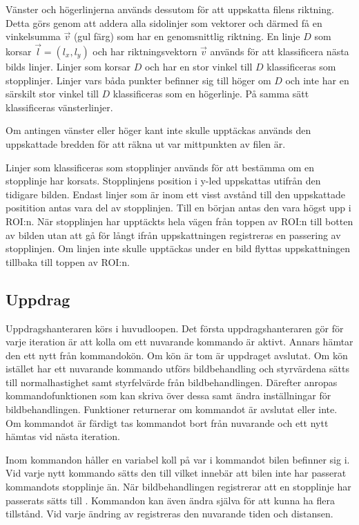 \documentclass[tekniskrapport/tech.tex]{subfiles}
\begin{document}
Vänster och högerlinjerna används dessutom för att uppskatta filens riktning.
Detta görs genom att addera alla sidolinjer som vektorer och därmed få en
vinkelsumma $\vec{v}$ (gul färg) som har en genomsnittlig riktning. En linje
$D$ som korsar $\vec{l}=(l_x, l_y)$ och har riktningsvektorn $\vec{v}$ används
för att klassificera nästa bilds linjer. Linjer som korsar $D$ och har en stor
vinkel till $D$ klassificeras som stopplinjer. Linjer vars båda punkter
befinner sig till höger om $D$ och inte har en särskilt stor vinkel till $D$
klassificeras som en högerlinje. På samma sätt klassificeras vänsterlinjer.

Om antingen vänster eller höger kant inte skulle upptäckas används den
uppskattade bredden för att räkna ut var mittpunkten av filen är.

Linjer som klassificeras som stopplinjer används för att bestämma om en
stopplinje har korsats. Stopplinjens position i y-led uppskattas utifrån den
tidigare bilden. Endast linjer som är inom ett visst avstånd till den
uppskattade positition antas vara del av stopplinjen. Till en början antas den
vara högst upp i ROI:n. När stopplinjen har upptäckts hela vägen från toppen av
ROI:n till botten av bilden utan att gå för långt ifrån uppskattningen
registreras en passering av stopplinjen. Om linjen inte skulle upptäckas under
en bild flyttas uppskattningen tillbaka till toppen av ROI:n.
  
\subsection{Uppdrag} \label{sec:comm-mission}
Uppdragshanteraren körs i huvudloopen. Det första uppdragshanteraren gör för
varje iteration är att kolla om ett nuvarande kommando är aktivt. Annars hämtar
den ett nytt från kommandokön. Om kön är tom är uppdraget avslutat. Om kön
istället har ett nuvarande kommando utförs bildbehandling och styrvärdena sätts
till normalhastighet samt styrfelvärde från bildbehandlingen. Därefter anropas
kommandofunktionen som kan skriva över dessa samt ändra inställningar för
bildbehandlingen. Funktioner returnerar om kommandot är avslutat eller inte. Om
kommandot är färdigt tas kommandot bort från nuvarande och ett nytt hämtas vid
nästa iteration.

Inom kommandon håller en variabel  koll på var i kommandot bilen
befinner sig i. Vid varje nytt kommando sätts den till 
vilket innebär att bilen inte har passerat kommandots stopplinje än. När
bildbehandlingen registrerar att en stopplinje har passerats sätts 
till . Kommandon kan även ändra  själva för att
kunna ha flera tillstånd. Vid varje ändring av  registreras den
nuvarande tiden och distansen.
\end{document}
